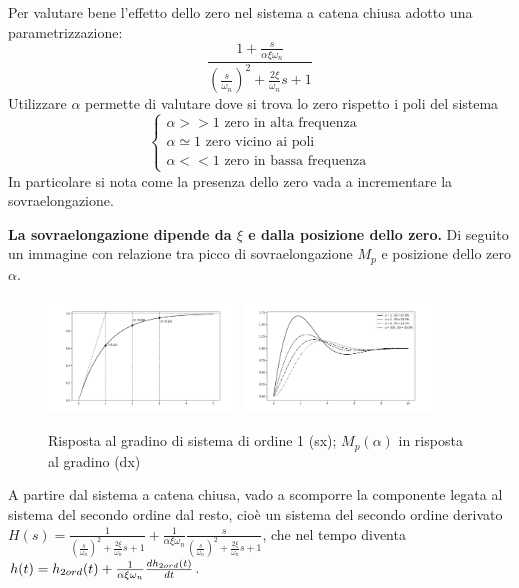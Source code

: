 Per valutare bene l'effetto dello zero nel sistema a catena chiusa adotto una parametrizzazione:
\[\frac{1+\frac{s}{\alpha \xi \omega_n}}{\left(\frac{s}{\omega_n}\right)^2+\frac{2\xi}{\omega_n}s+1}\]
Utilizzare \(\alpha\) permette di valutare dove si trova lo zero rispetto i poli del sistema
\[
\begin{cases}
\alpha >> 1 \text{ \ zero in alta frequenza} \\
\alpha \simeq 1 \text{ \ zero vicino ai poli} \\
\alpha << 1 \text{ \ zero in bassa frequenza}
\end{cases}
\]
In particolare si nota come la presenza dello zero vada a incrementare la sovraelongazione.

\textbf{La sovraelongazione dipende da \(\xi\) e dalla posizione dello zero.} Di seguito un immagine con relazione tra picco di sovraelongazione \(M_p\) e posizione dello zero \(\alpha\).

\begin{figure}[h]
    \centering
    \includegraphics[width=0.45\textwidth]{Immagini/risposta_gradino_ord1_tempo.png}
    \includegraphics[width=0.45\textwidth]{Immagini/influenza_zero_su_sovraelong.png}
    \caption{Risposta al gradino di sistema di ordine 1 (sx); \(M_p(\alpha)\) in risposta al gradino (dx)}
\end{figure}

A partire dal sistema a catena chiusa, vado a scomporre la componente legata al sistema del secondo ordine dal resto, cioè un sistema del secondo ordine derivato \(H(s)=\frac{1}{\left(\frac{s}{\omega_n}\right)^2+\frac{2\xi}{\omega_n}s+1} + \frac{1}{\alpha \xi \omega_n}\frac{s}{\left(\frac{s}{\omega_n}\right)^2+\frac{2\xi}{\omega_n}s+1}\), che nel tempo diventa \(h(t)=h_{2 ord}(t) + \frac{1}{\alpha \xi \omega_n} \frac{dh_{2 ord}(t)}{dt}\).

